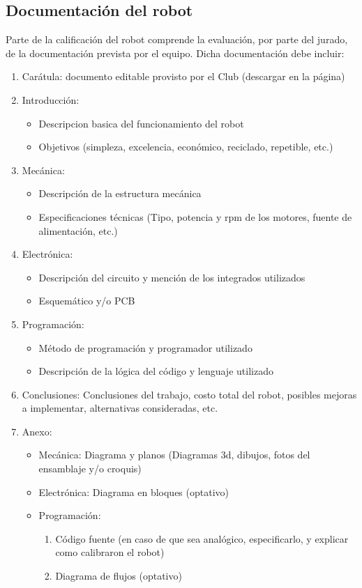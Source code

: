 \documentclass[a4paper,11pt]{article}
\begin{document}
\subsection*{Documentación del robot}
Parte de la calificación del robot comprende la evaluación, por parte del jurado, de la documentación prevista por el equipo.
Dicha documentación debe incluir:
\begin{enumerate}
  \item Carátula: documento editable provisto por el Club (descargar en la página) 
  \item Introducción:
  \begin{itemize}
    \item Descripcion basica del funcionamiento del robot 
    \item Objetivos (simpleza, excelencia, económico, reciclado, repetible, etc.)
  \end{itemize}
  \item Mecánica:
  \begin{itemize}
    \item Descripción de la estructura mecánica
    \item Especificaciones técnicas (Tipo, potencia y rpm de los motores, fuente de alimentación, etc.)
  \end{itemize}
  \item Electrónica:
  \begin{itemize}
    \item Descripción del circuito y mención de los integrados utilizados
    \item Esquemático y/o PCB 
  \end{itemize}
  \item Programación:
  \begin{itemize}
    \item Método de programación y programador utilizado
    \item Descripción de la lógica del código y lenguaje utilizado 
  \end{itemize}
  \item Conclusiones: Conclusiones del trabajo, costo total del robot, posibles mejoras a implementar, alternativas consideradas, etc.
  \item Anexo:
  \begin{itemize}
    \item Mecánica: Diagrama y planos (Diagramas 3d, dibujos, fotos del ensamblaje y/o croquis)
    \item Electrónica: Diagrama en bloques (optativo)
    \item Programación: 
    \begin{enumerate}
      \item Código fuente (en caso de que sea analógico, especificarlo, y explicar como calibraron el robot)
      \item Diagrama de flujos (optativo)
    \end{enumerate}
  \end{itemize}
\end{enumerate}
\end{document}
